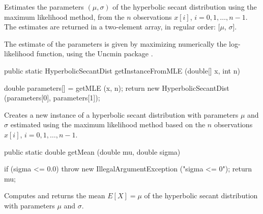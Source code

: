 \begin{tabb}
  Estimates the parameters $(\mu, \sigma)$ of the hyperbolic secant distribution
  using the maximum likelihood method, from the $n$ observations
   $x[i]$, $i = 0, 1,\ldots, n-1$. The estimates are returned in a two-element
    array, in regular order: [$\mu$, $\sigma$].
   \begin{detailed}
   The estimate of the parameters is given by maximizing numerically the
   log-likelihood function, using the Uncmin package \cite{iSCHa,iVERa}.
   \end{detailed}
\end{tabb}
\begin{htmlonly}
\end{htmlonly}
\begin{code}

   public static HyperbolicSecantDist getInstanceFromMLE (double[] x, int n)\begin{hide} {
      double parameters[] = getMLE (x, n);
      return new HyperbolicSecantDist (parameters[0], parameters[1]);
   }\end{hide}
\end{code}
\begin{tabb}
   Creates a new instance of a hyperbolic secant distribution with parameters
   $\mu$ and $\sigma$ estimated using the maximum likelihood method based on
   the $n$ observations $x[i]$, $i = 0, 1, \ldots, n-1$.
\end{tabb}
\begin{htmlonly}
\end{htmlonly}
\begin{code}

   public static double getMean (double mu, double sigma)\begin{hide} {
      if (sigma <= 0.0)
         throw new IllegalArgumentException ("sigma <= 0");
      return mu;
   }\end{hide}
\end{code}
\begin{tabb}  Computes and returns the mean $E[X] = \mu$ of the
   hyperbolic secant distribution with parameters
   $\mu$ and $\sigma$.
\end{tabb}
